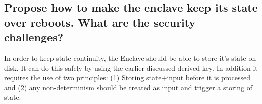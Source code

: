\documentclass{article}
\begin{document}
\subsection{Propose how to make the enclave keep its state over reboots.  What are
the security challenges?}

In order to keep state continuity, the Enclave should be able to store it's
state on disk. It can do this safely by using the earlier discussed derived key.
In addition it requires the use of two principles: (1) Storing state+input before it
is processed and (2) any non-determinism should be treated as input and trigger
a storing of state.
\end{document}
